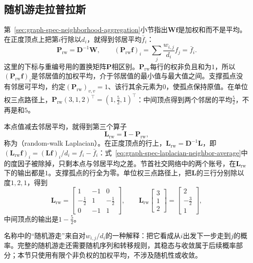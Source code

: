 \subsection{随机游走拉普拉斯}
\label{sec:graph-spec-random-walk-laplacian}

第~\ref{sec:graph-spec-neighborhood-aggregation}小节指出$\bm W\bm f$是加权和而不是平均。在正度顶点上把第$i$行除以$d_i$，就得到邻居平均$\bar f_i$：
\[
 \bm P_{\mathrm{rw}}=\bm D^{-1}\bm W,\qquad
 (\bm P_{\mathrm{rw}}\bm f)_i=\sum_j\frac{w_{i,j}}{d_i}f_j=\bar f_i .
\]
这里的下标与重编号用的置换矩阵$\bm P$相区别。$\bm P_{\mathrm{rw}}$每行的权非负且和为$1$，所以$(\bm P_{\mathrm{rw}}\bm f)_i$是邻居值的加权平均，介于邻居值的最小值与最大值之间。支撑孤点没有邻居可平均，约定$(\bm P_{\mathrm{rw}})_{v,v}=1$、该行其余元素为$0$，使孤点保持原值。在单位权三点路径上，$\bm P_{\mathrm{rw}}(3,1,2)^{\top}=(1,\tfrac52,1)^{\top}$：中间顶点得到两个邻居的平均$\tfrac52$，不再是和$5$。

本点值减去邻居平均，就得到第三个算子
\begin{equation}
 \bm L_{\mathrm{rw}}=\bm I-\bm P_{\mathrm{rw}} ,
 \label{eq:graph-spec-random-walk-laplacian}
\end{equation}
称为（random-walk Laplacian）。在正度顶点的行上，$\bm L_{\mathrm{rw}}=\bm D^{-1}\bm L$，即$(\bm L_{\mathrm{rw}}\bm f)_i=(\bm L\bm f)_i/d_i=f_i-\bar f_i$：式~\eqref{eq:graph-spec-laplacian-neighbor-average}中的度因子被除掉，只剩本点与邻居平均之差。节首社交网络中的两个账号，在$\bm L_{\mathrm{rw}}$下的输出都是$1$。支撑孤点的行全为零。单位权三点路径上，把$\bm L$的三行分别除以度$1,2,1$，得到
\[
 \bm L_{\mathrm{rw}}=\begin{bmatrix}1&-1&0\\-\tfrac12&1&-\tfrac12\\0&-1&1\end{bmatrix},\qquad
 \bm L_{\mathrm{rw}}\begin{bmatrix}3\\1\\2\end{bmatrix}=\begin{bmatrix}2\\-\tfrac32\\1\end{bmatrix},
\]
中间顶点的输出是$1-\tfrac52$。

名称中的“随机游走”来自对$w_{i,j}/d_i$的一种解释：把它看成从$i$出发下一步走到$j$的概率。完整的随机游走还需要随机序列和转移规则，其稳态与收敛属于后续概率部分；本节只使用有限个非负权的加权平均，不涉及随机性或收敛。

